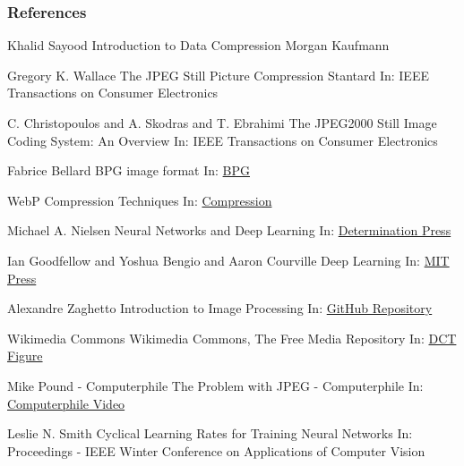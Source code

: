 \documentclass{beamer}
\begin{document}
\begin{frame}[allowframebreaks]
\frametitle{References}
\footnotesize{
\begin{thebibliography}{99} %
 Khalid Sayood
\newblock Introduction to Data Compression
\newblock Morgan Kaufmann

 Gregory K. Wallace
\newblock The JPEG Still Picture Compression Stantard
\newblock In: IEEE Transactions on Consumer Electronics

 C. Christopoulos and A. Skodras and T. Ebrahimi
\newblock The JPEG2000 Still Image Coding System: An Overview
\newblock In: IEEE Transactions on Consumer Electronics

 Fabrice Bellard
\newblock BPG image format
\newblock In: \href{https://bellard.org/bpg/}{BPG}

 WebP
\newblock Compression Techniques 
\newblock In: \href{https://developers.google.com/speed/webp/docs/compression}{Compression}

 Michael A. Nielsen
\newblock Neural Networks and Deep Learning
\newblock In: \href{http://neuralnetworksanddeeplearning.com/}{Determination Press}

 Ian Goodfellow and Yoshua Bengio and Aaron Courville
\newblock Deep Learning
\newblock In: \href{http://www.deeplearningbook.org}{MIT Press}

 Alexandre Zaghetto
\newblock Introduction to Image Processing
\newblock In: \href{https://github.com/zaghetto/ImageProcessing}{GitHub Repository}

 Wikimedia Commons
\newblock Wikimedia Commons, The Free Media Repository
\newblock In: \href{https://commons.wikimedia.org/w/index.php?curid=10414002}{DCT Figure}

 Mike Pound - Computerphile
\newblock The Problem with JPEG - Computerphile
\newblock In: \href{https://youtu.be/yBX8GFqt6GA?t=48}{Computerphile Video}

 Leslie N. Smith
\newblock Cyclical Learning Rates for Training Neural Networks
\newblock In: Proceedings - IEEE Winter Conference on Applications of Computer Vision


\end{thebibliography}}
\end{frame}
\end{document}
